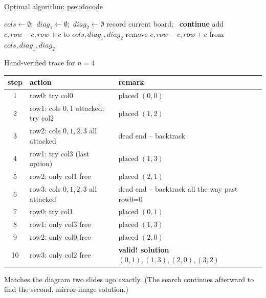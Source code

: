 \documentclass[11pt,aspectratio=169]{beamer}
\begin{document}
\begin{frame}{Optimal algorithm: pseudocode}
  \footnotesize
  \begin{algorithmic}[1]
      \State $cols \gets \emptyset$;\ $diag_1 \gets \emptyset$;\ $diag_2 \gets \emptyset$
      \State {}
    \EndFunction
       record current board;\ \Return \EndIf
          \State \textbf{continue} 
        \EndIf
        \State add $c, row{-}c, row{+}c$ to $cols, diag_1, diag_2$
        \State {}
        \State remove $c, row{-}c, row{+}c$ from $cols, diag_1, diag_2$
      \EndFor
    \EndFunction
  \end{algorithmic}
\end{frame}

\begin{frame}{Hand-verified trace for $n=4$}
  \scriptsize
  \begin{center}
  \begin{tabular}{@{}c p{4.6cm} p{5.4cm}@{}}
    \toprule
    step & action & remark \\
    \midrule
    1 & row0: try col0 & placed $(0,0)$ \\
    2 & row1: cols $0,1$ attacked; try col2 & placed $(1,2)$ \\
    3 & row2: cols $0,1,2,3$ all attacked & dead end -- backtrack \\
    4 & row1: try col3 (last option) & placed $(1,3)$ \\
    5 & row2: only col1 free & placed $(2,1)$ \\
    6 & row3: cols $0,1,2,3$ all attacked & dead end -- backtrack all the way past row0=0 \\
    7 & row0: try col1 & placed $(0,1)$ \\
    8 & row1: only col3 free & placed $(1,3)$ \\
    9 & row2: only col0 free & placed $(2,0)$ \\
    10 & row3: only col2 free & \textbf{valid! solution} $(0,1),(1,3),(2,0),(3,2)$ \\
    \bottomrule
  \end{tabular}
  \end{center}
  Matches the diagram two slides ago exactly. (The search continues afterward to find
  the second, mirror-image solution.)
\end{frame}
\end{document}
